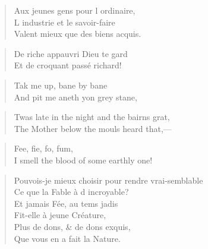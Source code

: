 \begin{verse}
\textquotesingle{} Aux jeunes gens pour l\textquotesingle{} ordinaire, \\
L\textquotesingle{} industrie et le savoir-faire \\
Valent mieux que des biens acquis.\textquotesingle{} 
\end{verse}

\begin{verse}
De riche appauvri Dieu te gard\textquotesingle{}  \\
Et de croquant passé richard!
\end{verse}

\begin{verse}
\vin Tak me up, bane by bane \\
\vin And pit me aneth yon grey stane,
\end{verse}

\begin{verse}
\textquotesingle{} Twas late in the night and the bairns grat, \\
The Mother below the mouls heard that,—
\end{verse}

\begin{verse}
Fee, fie, fo, fum, \\
I smell the blood of some earthly one!
\end{verse}

\begin{verse}
Pouvois-je mieux choisir pour rendre vrai-semblable \\
\vin Ce que la Fable à d\textquotesingle{} incroyable? \\
\vin Et jamais Fée, au tems jadis \\
\vin Fit-elle à jeune Créature, \\
\vin Plus de dons, \& de dons exquis, \\
\vin Que vous en a fait la Nature.
\end{verse}

